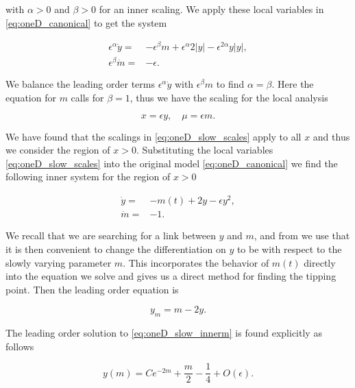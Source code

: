 with $\alpha>0$ and $\beta>0$ for an inner scaling. We apply these local variables in \eqref{eq:oneD_canonical} to get the system

\begin{equation}\label{eq:oneD_slow_scalesearch}
\begin{aligned}
\epsilon^\alpha \dot{y}=&-\epsilon^\beta m +\epsilon^\alpha 2|y|-\epsilon^{2\alpha}y|y|,\\
 \epsilon^\beta \dot{m}=&-\epsilon.
\end{aligned}
\end{equation}

We balance the leading order terms $\epsilon^\alpha\dot{y}$ with $\epsilon^\beta m$ to find $\alpha=\beta$. Here the equation for $m$ calls for $\beta=1$, thus we have the scaling for the local analysis

\begin{equation}\label{eq:oneD_slow_scales}
x=\epsilon y,\quad \mu=\epsilon m.
\end{equation}

We have found that the scalings in \eqref{eq:oneD_slow_scales} apply to all $x$ and thus we consider the region of $x>0$. Substituting the local variables \eqref{eq:oneD_slow_scales} into the original model \eqref{eq:oneD_canonical} we find the following inner system for the region of $x>0$

\begin{equation}\label{eq:oneD_slow_innereq}
\begin{aligned}
\dot{y}=&-m(t)+2 y-\epsilon y^2,\\
\dot{m}=&-1.
\end{aligned}
\end{equation}

We recall that we are searching for a link between $y$ and $m$, and from \cite{haberman1979slowly} we use that it is then convenient to change the differentiation on $y$ to be with respect to the slowly varying parameter $m$. This incorporates the behavior of $m(t)$ directly into the equation we solve and gives us a direct method for finding the tipping point. Then the leading order equation is

\begin{equation}\label{eq:oneD_slow_innerm}
y_m = m-2y.
\end{equation}

The leading order solution to \eqref{eq:oneD_slow_innerm} is found explicitly as follows

\begin{equation*}
y(m) = C e^{-2m}+\frac{m}{2}-\frac{1}{4}+O(\epsilon).
\end{equation*}

